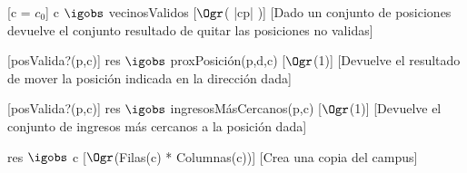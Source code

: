 \begin{Interfaz}
	[c = $c_0$]
	{c $\igobs$ vecinosValidos}
	[$\Ogr$( |cp| )]
	[Dado un conjunto de posiciones devuelve el conjunto resultado de quitar las posiciones no validas]
	
	[posValida?(p,c)]
	{res $\igobs$ proxPosición(p,d,c)}
	[$\Ogr$(1)]
	[Devuelve el resultado de mover la posición indicada en la dirección dada]
		
	[posValida?(p,c)]
	{res $\igobs$ ingresosMásCercanos(p,c)}
	[$\Ogr$(1)]
	[Devuelve el conjunto de ingresos más cercanos a la posición dada]
	
	{res $\igobs$ c}
	[$\Ogr$(Filas(c) * Columnas(c))]
	[Crea una copia del campus]
				
\end{Interfaz}

